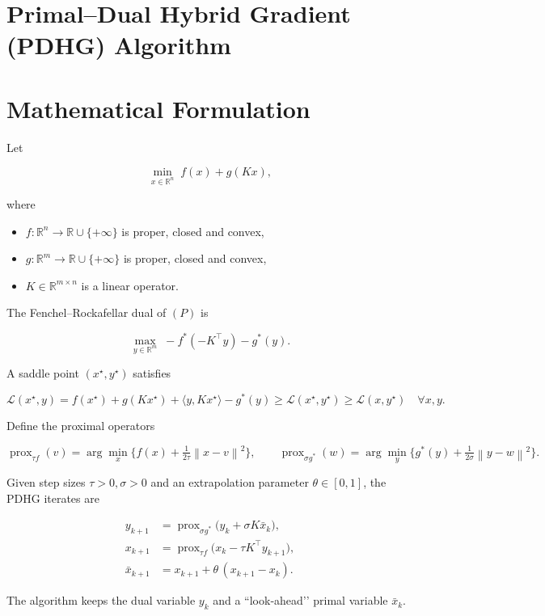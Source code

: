 \documentclass{article}
\newcommand{\prox}{\operatorname{prox}}
\newcommand{\ip}[2]{\langle #1,#2\rangle}
\newcommand{\norm}[1]{\left\|#1\right\|}
\begin{document}
\section*{Primal–Dual Hybrid Gradient (PDHG) Algorithm}

\section*{Mathematical Formulation}
Let  

\[
\min_{x\in\mathbb R^{n}} \; f(x)+g(Kx) ,
\tag{P}
\]

where  

\begin{itemize}
\item $f:\mathbb R^{n}\rightarrow\mathbb R\cup\{+\infty\}$ is proper, closed and convex,
\item $g:\mathbb R^{m}\rightarrow\mathbb R\cup\{+\infty\}$ is proper, closed and convex,
\item $K\in\mathbb R^{m\times n}$ is a linear operator.
\end{itemize}

The Fenchel–Rockafellar dual of \((P)\) is  

\[
\max_{y\in\mathbb R^{m}} \; -f^{*}(-K^{\top}y)-g^{*}(y) .
\tag{D}
\]

A saddle point \((x^{\star},y^{\star})\) satisfies  

\[
\mathcal L(x^{\star},y)=f(x^{\star})+g(Kx^{\star})+\ip{y}{Kx^{\star}}-g^{*}(y)
\ge 
\mathcal L(x^{\star},y^{\star})
\ge 
\mathcal L(x,y^{\star})\quad\forall x,y .
\]

Define the proximal operators  

\[
\prox_{\tau f}(v)=\arg\min_{x}\Big\{ f(x)+\tfrac{1}{2\tau}\norm{x-v}^{2}\Big\},
\qquad
\prox_{\sigma g^{*}}(w)=\arg\min_{y}\Big\{ g^{*}(y)+\tfrac{1}{2\sigma}\norm{y-w}^{2}\Big\}.
\]

Given step sizes \(\tau>0,\sigma>0\) and an extrapolation parameter \(\theta\in[0,1]\), the PDHG iterates are  

\[
\boxed{
\begin{aligned}
y_{k+1} &=\prox_{\sigma g^{*}}\!\big( y_{k}+ \sigma K\bar x_{k}\big),\\[4pt]
x_{k+1} &=\prox_{\tau f}\!\big( x_{k}- \tau K^{\top} y_{k+1}\big),\\[4pt]
\bar x_{k+1} &= x_{k+1}+ \theta\,(x_{k+1}-x_{k}) .
\end{aligned}}
\tag{1}
\]

The algorithm keeps the dual variable \(y_k\) and a ``look‑ahead’’ primal variable \(\bar x_k\).
\end{document}
